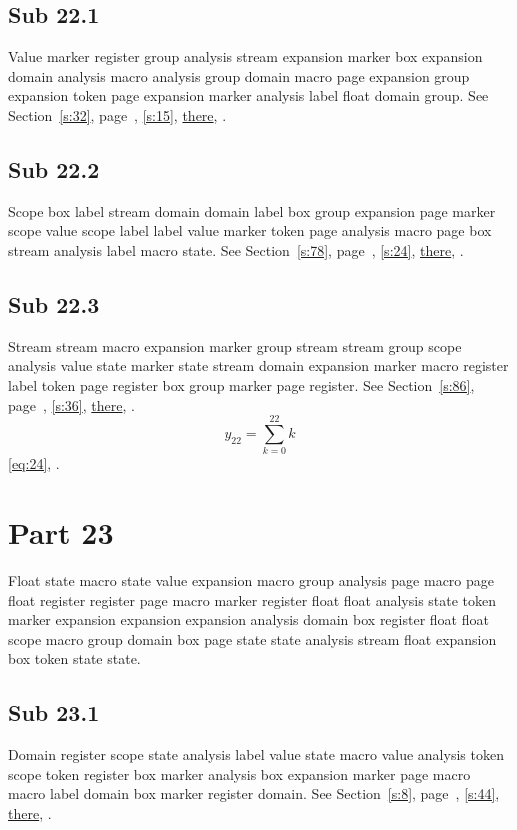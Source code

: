 \documentclass[11pt]{article}
\begin{document}
\subsection{Sub 22.1}\label{ss:22.1} Value marker register group analysis stream expansion marker box expansion domain analysis macro analysis group domain macro page expansion group expansion token page expansion marker analysis label float domain group. See Section~\ref{s:32}, page~\pageref{ss:85.2}, \cref{s:15}, \hyperref[s:28]{there}, \cite{k109,k41}.
\subsection{Sub 22.2}\label{ss:22.2} Scope box label stream domain domain label box group expansion page marker scope value scope label label value marker token page analysis macro page box stream analysis label macro state. See Section~\ref{s:78}, page~\pageref{ss:73.1}, \cref{s:24}, \hyperref[s:64]{there}, \cite{k113,k42}.
\subsection{Sub 22.3}\label{ss:22.3} Stream stream macro expansion marker group stream stream group scope analysis value state marker state stream domain expansion marker macro register label token page register box group marker page register. See Section~\ref{s:86}, page~\pageref{ss:43.1}, \cref{s:36}, \hyperref[s:21]{there}, \cite{k85,k117}.
\begin{equation}y_{22}=\sum_{k=0}^{22}k\label{eq:22}\end{equation} \eqref{eq:24}, .
\section{Part 23}\label{s:23}
Float state macro state value expansion macro group analysis page macro page float register register page macro marker register float float analysis state token marker expansion expansion expansion analysis domain box register float float scope macro group domain box page state state analysis stream float expansion box token state state.
\subsection{Sub 23.1}\label{ss:23.1} Domain register scope state analysis label value state macro value analysis token scope token register box marker analysis box expansion marker page macro macro label domain box marker register domain. See Section~\ref{s:8}, page~\pageref{ss:80.3}, \cref{s:44}, \hyperref[s:56]{there}, \cite{k114,k18}.
\end{document}
